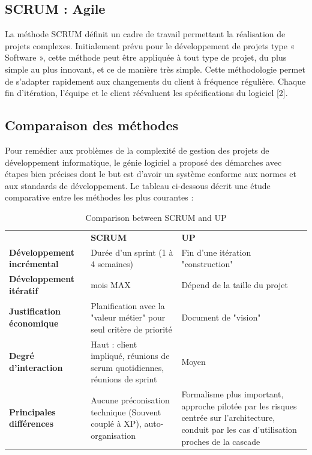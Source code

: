 \begin{sloppypar}
\subsection{SCRUM : Agile}
\vspace{-4mm}
La méthode SCRUM définit un cadre de travail permettant la réalisation de projets complexes. Initialement prévu pour le développement de projets type « Software », cette méthode peut être appliquée à tout type de projet, du plus simple au plus innovant, et ce de manière très simple. Cette méthodologie permet de s’adapter rapidement aux changements du client à fréquence régulière. Chaque fin d'itération, l'équipe et le client réévaluent les spécifications du logiciel [2].
\vspace{-6mm}
\subsection{Comparaison des méthodes }
\vspace{-4mm}
Pour remédier aux problèmes de la complexité de gestion des projets de développement informatique, le génie logiciel a proposé des démarches avec étapes bien précises dont le but est d’avoir un système conforme aux normes et aux standards de développement. Le tableau ci-dessous décrit une étude comparative entre les méthodes les plus courantes :
\begin{table}[h]
\centering
\setlength{\extrarowheight}{4pt}
\caption{Comparison between SCRUM and UP}
\begin{tabularx}{\textwidth}{|>{\raggedright\arraybackslash}X|>{\raggedright\arraybackslash}X|>{\raggedright\arraybackslash}X|}
\hline 
\multicolumn{3}{|c|}{\textbf{Méthodes}} \\
\hline
\textbf{} & \textbf{SCRUM} & \textbf{UP} \\
\hline
\textbf{Développement incrémental} & Durée d'un sprint (1 à 4 semaines) & Fin d'une itération "construction" \\
\hline
\textbf{Développement itératif} & 1 mois MAX & Dépend de la taille du projet \\
\hline
\textbf{Justification économique} & Planification avec la "valeur métier" pour seul critère de priorité & Document de "vision" \\
\hline
\textbf{Degré d'interaction} & Haut : client impliqué, réunions de scrum quotidiennes, réunions de sprint & Moyen \\
\hline
\textbf{Principales différences} & Aucune préconisation technique (Souvent couplé à XP), auto-organisation & Formalisme plus important, approche pilotée par les risques centrée sur l'architecture, conduit par les cas d'utilisation proches de la cascade \\
\hline
\end{tabularx}
\end{table}
\vspace{-6mm}

\end{sloppypar}
